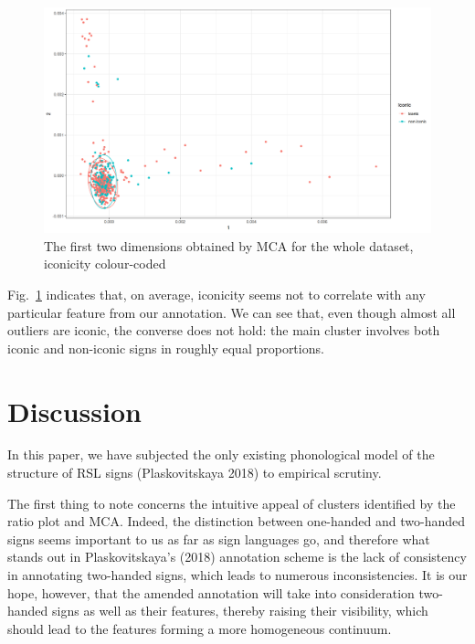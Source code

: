 \begin{figure}
\hypertarget{fig:iconicity}{%
\centering
\includegraphics{iconicity.png}
\caption{The first two dimensions obtained by MCA for the whole dataset,
iconicity colour-coded}\label{fig:iconicity}
}
\end{figure}

Fig.~\ref{fig:iconicity} indicates that, on average, iconicity seems not
to correlate with any particular feature from our annotation. We can see
that, even though almost all outliers are iconic, the converse does not
hold: the main cluster involves both iconic and non-iconic signs in
roughly equal proportions.

\hypertarget{sec:discussion}{%
\section{Discussion}\label{sec:discussion}}

In this paper, we have subjected the only existing phonological model of
the structure of RSL signs (Plaskovitskaya 2018) to empirical scrutiny.

The first thing to note concerns the intuitive appeal of clusters
identified by the ratio plot and MCA. Indeed, the distinction between
one-handed and two-handed signs seems important to us as far as sign
languages go, and therefore what stands out in Plaskovitskaya's (2018)
annotation scheme is the lack of consistency in annotating two-handed
signs, which leads to numerous inconsistencies. It is our hope, however,
that the amended annotation will take into consideration two-handed
signs as well as their features, thereby raising their visibility, which
should lead to the features forming a more homogeneous continuum.

